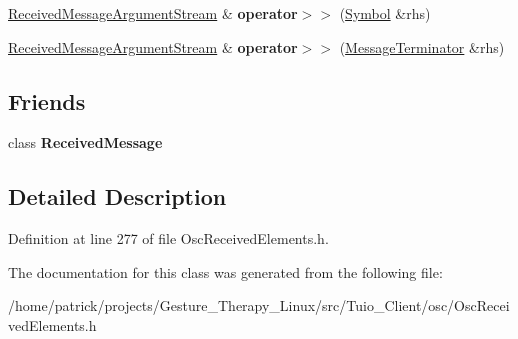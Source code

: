 \begin{DoxyCompactItemize}
\mbox{\label{classosc_1_1_received_message_argument_stream_a5d22d11b029f81c2c1ed4800eb22e984}} 
\hyperlink{classosc_1_1_received_message_argument_stream}{Received\+Message\+Argument\+Stream} \& {\bfseries operator$>$$>$} (\hyperlink{structosc_1_1_symbol}{Symbol} \&rhs)
\item 
\mbox{\label{classosc_1_1_received_message_argument_stream_a0845682e01760c44f8555d822162f6d4}} 
\hyperlink{classosc_1_1_received_message_argument_stream}{Received\+Message\+Argument\+Stream} \& {\bfseries operator$>$$>$} (\hyperlink{structosc_1_1_message_terminator}{Message\+Terminator} \&rhs)
\end{DoxyCompactItemize}
\subsection*{Friends}
\begin{DoxyCompactItemize}
\item 
\mbox{\label{classosc_1_1_received_message_argument_stream_aad6d2fbe1655be2e7c6be24bef7db745}} 
class {\bfseries Received\+Message}
\end{DoxyCompactItemize}


\subsection{Detailed Description}


Definition at line 277 of file Osc\+Received\+Elements.\+h.



The documentation for this class was generated from the following file\+:\begin{DoxyCompactItemize}
\item 
/home/patrick/projects/\+Gesture\+\_\+\+Therapy\+\_\+\+Linux/src/\+Tuio\+\_\+\+Client/osc/Osc\+Received\+Elements.\+h\end{DoxyCompactItemize}
